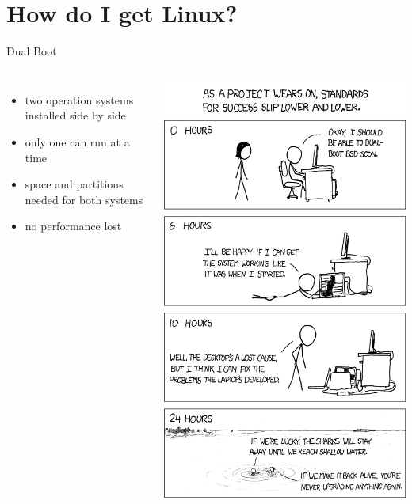 \documentclass[10pt,graphics,aspectratio=169,table]{beamer}
\begin{document}
\section{How do I get Linux?}
\begin{frame}{Dual Boot}
\begin{columns}
        \begin{itemize}
            \item two operation systems installed side by side
            \item only one can run at a time
            \item space and partitions needed for both systems
            \item no performance lost
        \end{itemize}
        \includegraphics[height=0.75\paperheight]{img/success.png} \cite{success}
\end{columns}
\end{frame}
\end{document}
